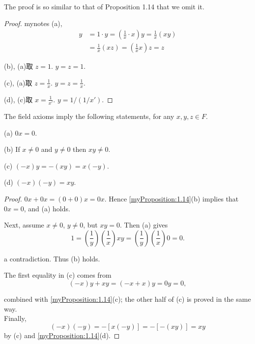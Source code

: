 The proof is so similar to that of Proposition 1.14 that we omit it.


\begin{proof}
mynotes
(a),  
\begin{align*}
    y&=1\cdot y=\left(\frac{1}{x}\cdot x\right)y =\frac{1}{x}\left( xy \right)\\
    &=\frac{1}{x}(xz) =\left(\frac{1}{x}x\right)z = z
\end{align*}

(b), (a)取  $z=1$. $y=z=1$.

(c), (a)取  $z=\frac{1}{x}$. $y=z=\frac{1}{x}$.

(d), (c)取  $x=\frac{1}{x'}$. $y=1/(1/x')$.
\end{proof}

\begin{myProposition}\label{Proposition:1.16}
    The field axioms imply the following statements, for any $x, y, z \in F$.

    (a) $0x=0$.

    (b) If $x\neq 0$ and $y\neq 0$ then $xy\neq 0$.

    (c) $(-x)y=-(xy)=x(-y)$.

    (d) $(-x)(-y)=xy$.
\end{myProposition}

\begin{proof}
    $0x+0x=(0+0)x=0x$. Hence \ref{myProposition:1.14}(b) implies that $0x=0$, and (a) holds.

    Next, assume $x \neq 0$, $y \neq 0$, but $xy =0$. Then (a) gives
    \begin{equation*}
        1=
        \left(\frac{1}{y}\right)\left(\frac{1}{x}\right)xy=
        \left(\frac{1}{y}\right)\left(\frac{1}{x}\right)0=0.
    \end{equation*}

a contradiction. Thus (b) holds.

The first equality in (c) comes from
\begin{equation*}
    (-x)y +xy=(-x+x)y=0y=0,
\end{equation*}

combined with \ref{myProposition:1.14}(c); the other half of (c) is proved in the same way.\\
Finally,
\begin{equation*}
    (-x)(-y)=-[x(-y)]=-[-(xy)]=xy
\end{equation*}
by (c) and \ref{myProposition:1.14}(d).
\end{proof}

